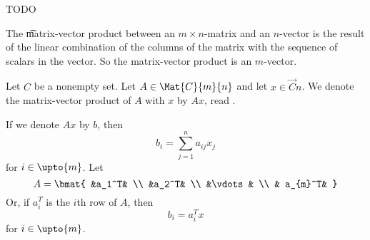 

TODO


The \t{matrix-vector product} between an $m \times n$-matrix and an $n$-vector is the result of the linear combination of the columns of the matrix with the sequence of scalars in the vector.
So the matrix-vector product is an $m$-vector.


Let $C$ be a nonempty set.
Let $A \in \Mat{C}{m}{n}$ and let $x \in \Vec{C}{n}$. We denote the matrix-vector product of $A$ with $x$ by $Ax$, read .

If we denote $Ax$ by $b$, then
$$
  b_i = \sum_{j = 1}^{n} a_{ij}x_j
$$
for $i \in \upto{m}$.
Let
$$
  A = \bmat{
    &a_1^T& \\
    &a_2^T& \\
    &\vdots & \\
    & a_{m}^T&
  }
$$
Or, if $a_i^T$ is the $i$th row of $A$, then
$$
  b_i = a_i^T x
$$
for $i \in \upto{m}$.
